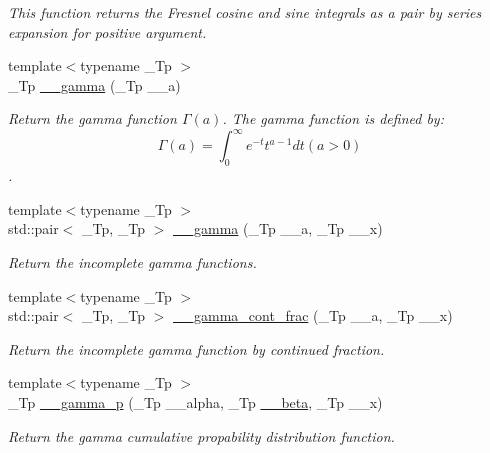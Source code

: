 \begin{DoxyCompactItemize}
\begin{DoxyCompactList}\small\item\em This function returns the Fresnel cosine and sine integrals as a pair by series expansion for positive argument. \end{DoxyCompactList}\item 
{\footnotesize template$<$typename \+\_\+\+Tp $>$ }\\\+\_\+\+Tp \hyperlink{namespacestd_1_1____detail_a178e0b2cc0ae66b7d958e837da4fe4c1}{\+\_\+\+\_\+gamma} (\+\_\+\+Tp \+\_\+\+\_\+a)
\begin{DoxyCompactList}\small\item\em Return the gamma function $ \Gamma(a) $. The gamma function is defined by\+: \[ \Gamma(a) = \int_0^\infty e^{-t}t^{a-1}dt (a > 0) \]. \end{DoxyCompactList}\item 
{\footnotesize template$<$typename \+\_\+\+Tp $>$ }\\std\+::pair$<$ \+\_\+\+Tp, \+\_\+\+Tp $>$ \hyperlink{namespacestd_1_1____detail_a00ade496acee116fb7990d20ff4be762}{\+\_\+\+\_\+gamma} (\+\_\+\+Tp \+\_\+\+\_\+a, \+\_\+\+Tp \+\_\+\+\_\+x)
\begin{DoxyCompactList}\small\item\em Return the incomplete gamma functions. \end{DoxyCompactList}\item 
{\footnotesize template$<$typename \+\_\+\+Tp $>$ }\\std\+::pair$<$ \+\_\+\+Tp, \+\_\+\+Tp $>$ \hyperlink{namespacestd_1_1____detail_afd6319747af991947a02388acee40c26}{\+\_\+\+\_\+gamma\+\_\+cont\+\_\+frac} (\+\_\+\+Tp \+\_\+\+\_\+a, \+\_\+\+Tp \+\_\+\+\_\+x)
\begin{DoxyCompactList}\small\item\em Return the incomplete gamma function by continued fraction. \end{DoxyCompactList}\item 
{\footnotesize template$<$typename \+\_\+\+Tp $>$ }\\\+\_\+\+Tp \hyperlink{namespacestd_1_1____detail_a33f9cf005ecdad199024712cc89c0bc6}{\+\_\+\+\_\+gamma\+\_\+p} (\+\_\+\+Tp \+\_\+\+\_\+alpha, \+\_\+\+Tp \hyperlink{namespacestd_1_1____detail_a090d2f0920e0d208c467609b2a81d717}{\+\_\+\+\_\+beta}, \+\_\+\+Tp \+\_\+\+\_\+x)
\begin{DoxyCompactList}\small\item\em Return the gamma cumulative propability distribution function. \end{DoxyCompactList}\item 

\end{DoxyCompactItemize}
